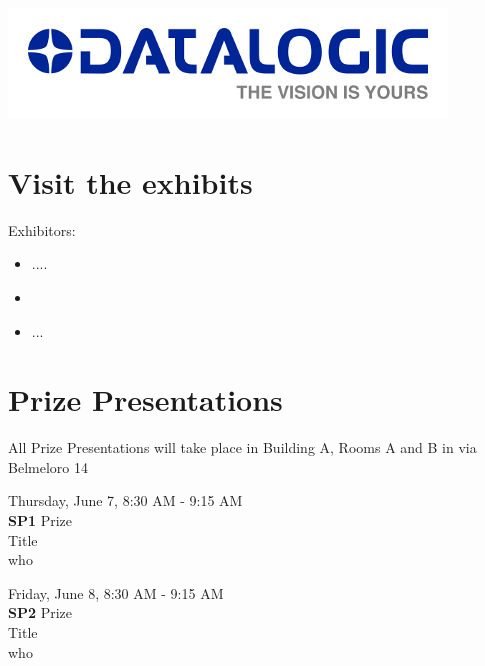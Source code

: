 \documentclass[10pt, a4paper]{book}
\begin{document}
\includegraphics[scale=0.9]{images/logo_DATALOGIC}\\
\section*{Visit the exhibits}
Exhibitors:
\begin{itemize}
\item ....
\item
\item ...
\end{itemize}







\newpage
\section*{Prize Presentations}
{\small{All Prize Presentations will take place in Building A, Rooms A and B in via Belmeloro 14}}
\vspace{2cm}
\begin{center}
Thursday, June 7, 8:30 AM - 9:15 AM \\
\textbf{SP1} Prize\\
Title\\
who\\
\end{center}
\vspace{2cm}
\begin{center}
Friday, June 8, 8:30 AM - 9:15 AM \\
\textbf{SP2} Prize\\
Title\\
who\\
\end{center}



%
\end{document}
